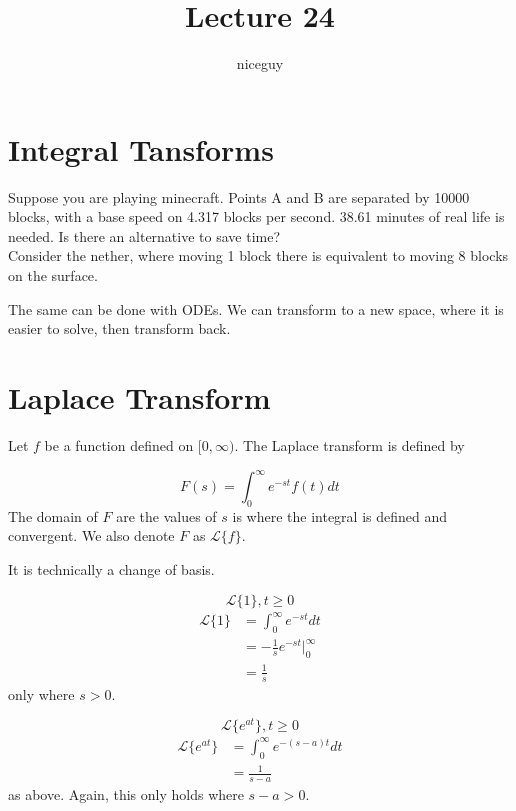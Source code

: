 \documentclass[12pt]{article}
\title{Lecture 24}
\author{niceguy}
\begin{document}
\maketitle

\section{Integral Tansforms}

\begin{ex}
	Suppose you are playing minecraft. Points A and B are separated by 10000 blocks, with a base speed on 4.317 blocks per second. 38.61 minutes of real life is needed. Is there an alternative to save time? \\
	Consider the nether, where moving 1 block there is equivalent to moving 8 blocks on the surface.
\end{ex}

The same can be done with ODEs. We can transform to a new space, where it is easier to solve, then transform back.

\section{Laplace Transform}

\begin{defn}
	Let $f$ be a function defined on $[0,\infty)$. The Laplace transform is defined by

	$$F(s) = \int_0^\infty e^{-st}f(t)dt$$
	The domain of $F$ are the values of $s$ is where the integral is defined and convergent. We also denote $F$ as $\mathcal{L}\{f\}$.
\end{defn}	

It is technically a change of basis.

\begin{ex}
	$$\mathcal{L}\{1\}, t \geq 0$$
	\begin{align*}
		\mathcal{L}\{1\} &= \int_0^\infty e^{-st}dt \\
				 &= -\frac{1}{s}e^{-st} \Big |_0^\infty \\
				 &= \frac{1}{s}
	\end{align*}
	only where $s > 0$.
\end{ex}

\begin{ex}
	$$\mathcal{L}\{e^{at}\}, t\geq 0$$
	\begin{align*}
		\mathcal{L}\{e^{at}\} &= \int_0^\infty e^{-(s-a)t}dt \\
				      &= \frac{1}{s-a}
	\end{align*}
	as above. Again, this only holds where $s-a>0$.
\end{ex}
\end{document}

